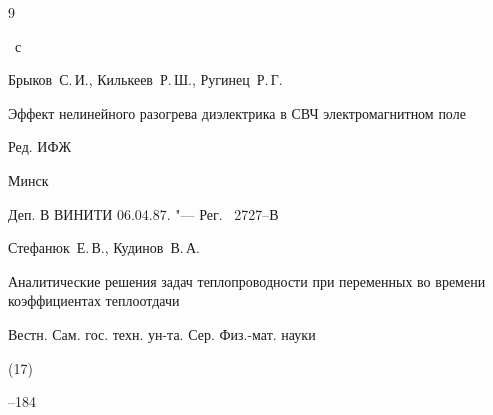 \begin{thebibliography}{9}

~с




\by Брыков~С.\,И., Килькеев~Р.\,Ш., Ругинец~Р.\,Г.

\book Эффект нелинейного разогрева диэлектрика в СВЧ электромагнитном поле

\publ Ред. ИФЖ

\publaddr Минск


\finalinfo Деп. В ВИНИТИ 06.04.87. "--- Рег. \No~2727--В




\by Стефанюк~Е.\,В., Кудинов~В.\,А.

\paper Аналитические решения задач теплопроводности при переменных во времени коэффициентах теплоотдачи

\jour Вестн. Сам. гос. техн. ун-та. Сер. Физ.-мат. науки


(17)

--184





\end{thebibliography}







\makeengtitle





%

